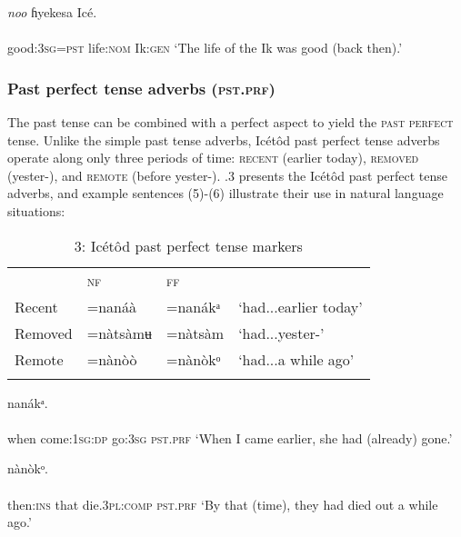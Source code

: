 \ea\label{ex:}
 \textit{noo}   ɦyekesa   Icé. \\
    \\
good:\textsc{3sg}=\textsc{pst}   life:\textsc{nom}   Ik:\textsc{gen}
\glt ‘The life of the Ik was good (back then).’ 
\z




\subsubsection{Past perfect tense adverbs (\textsc{pst.prf})}

The past tense can be combined with a perfect aspect to yield the \textsc{past perfect} tense. Unlike the simple past tense adverbs, Icétôd past perfect tense adverbs operate along only three periods of time: \textsc{recent} (earlier today), \textsc{removed} (yester-), and \textsc{remote} (before yester-). .3 presents the Icétôd past perfect tense adverbs, and example sentences (5)-(6) illustrate their use in natural language situations:


\begin{table}
\caption{3: Icétôd past perfect tense markers}
\label{tab:9}


\begin{tabularx}{\textwidth}{XXXX} & \textsc{nf} & \textsc{ff} & \\
\lsptoprule
Recent & =nanáà & =nanákᵃ & ‘had...earlier today’\\
Removed & =nàtsàmʉ & =nàtsàm & ‘had...yester-’\\
Remote & =nànòò & =nànòkᵒ & ‘had...a while ago’\\
\lspbottomrule
\end{tabularx}
\end{table}



\ea\label{ex:}
     nanákᵃ. \\
    \\
when  come:\textsc{1sg:dp}   go:\textsc{3sg}   \textsc{pst.prf}
\glt ‘When I came earlier, she had (already) gone.’ 
\z




\ea\label{ex:}
     nànòkᵒ. \\
    \\
then:\textsc{ins}   that   die.\textsc{3pl:comp}   \textsc{pst.prf}
\glt ‘By that (time), they had died out a while ago.’ 
\z




